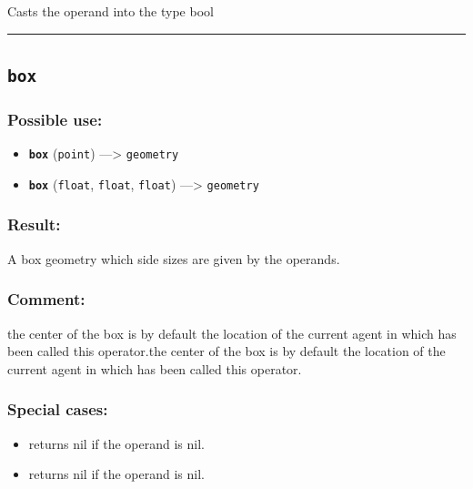 \documentclass[]{book}
\providecommand{\tightlist}{%
  \setlength{\itemsep}{0pt}\setlength{\parskip}{0pt}}
\theoremstyle{definition}
\theoremstyle{definition}
\theoremstyle{definition}
\theoremstyle{remark}
\begin{document}
Casts the operand into the type bool

\begin{center}\rule{0.5\linewidth}{\linethickness}\end{center}

\subsection{\texorpdfstring{\texttt{box}}{box}}\label{box}

\subsubsection{Possible use:}\label{possible-use-76}

\begin{itemize}
\tightlist
\item
  \textbf{\texttt{box}} (\texttt{point}) ---\textgreater{}
  \texttt{geometry}
\item
  \textbf{\texttt{box}} (\texttt{float}, \texttt{float}, \texttt{float})
  ---\textgreater{} \texttt{geometry}
\end{itemize}

\subsubsection{Result:}\label{result-75}

A box geometry which side sizes are given by the operands.

\subsubsection{Comment:}\label{comment-16}

the center of the box is by default the location of the current agent in
which has been called this operator.the center of the box is by default
the location of the current agent in which has been called this
operator.

\subsubsection{Special cases:}\label{special-cases-26}

\begin{itemize}
\tightlist
\item
  returns nil if the operand is nil.\\
\item
  returns nil if the operand is nil.
\end{itemize}
\end{document}
